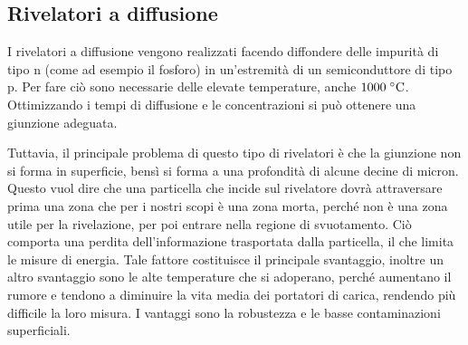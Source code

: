 \subsection{Rivelatori a diffusione}
I rivelatori a diffusione vengono realizzati facendo diffondere delle impurità di tipo n (come ad esempio il fosforo) in un'estremità di un semiconduttore di tipo p. Per fare ciò sono necessarie delle elevate temperature, anche $1000 \; ^{\circ}\rm C$. Ottimizzando i tempi di diffusione e le concentrazioni si può ottenere una giunzione adeguata.
\begin{figure}[H]
   \centering
 \end{figure}
Tuttavia, il principale problema di questo tipo di rivelatori è che la giunzione non si forma in superficie, bensì si forma a una profondità di alcune decine di micron. Questo vuol dire che una particella che incide sul rivelatore dovrà attraversare prima una zona che per i nostri scopi è una zona morta, perché non è una zona utile per la rivelazione, per poi entrare nella regione di svuotamento. Ciò comporta una perdita dell'informazione trasportata dalla particella, il che limita le misure di energia. Tale fattore costituisce il principale svantaggio, inoltre un altro svantaggio sono le alte temperature che si adoperano, perché aumentano il rumore e tendono a diminuire la vita media dei portatori di carica, rendendo più difficile la loro misura. I vantaggi sono la robustezza e le basse contaminazioni superficiali.

